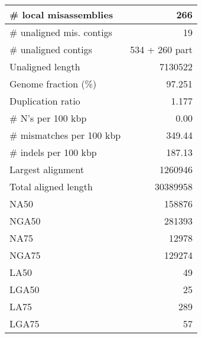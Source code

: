 \documentclass[12pt,a4paper]{article}
\begin{document}
\begin{table}[ht]
\begin{center}
\begin{tabular}{|l*{1}{|r}|}
\# local misassemblies & 266 \\ \hline
\# unaligned mis. contigs & 19 \\ \hline
\# unaligned contigs & 534 + 260 part \\ \hline
Unaligned length & 7130522 \\ \hline
Genome fraction (\%) & 97.251 \\ \hline
Duplication ratio & 1.177 \\ \hline
\# N's per 100 kbp & 0.00 \\ \hline
\# mismatches per 100 kbp & 349.44 \\ \hline
\# indels per 100 kbp & 187.13 \\ \hline
Largest alignment & 1260946 \\ \hline
Total aligned length & 30389958 \\ \hline
NA50 & 158876 \\ \hline
NGA50 & 281393 \\ \hline
NA75 & 12978 \\ \hline
NGA75 & 129274 \\ \hline
LA50 & 49 \\ \hline
LGA50 & 25 \\ \hline
LA75 & 289 \\ \hline
LGA75 & 57 \\ \hline
\end{tabular}
\end{center}
\end{table}
\end{document}
